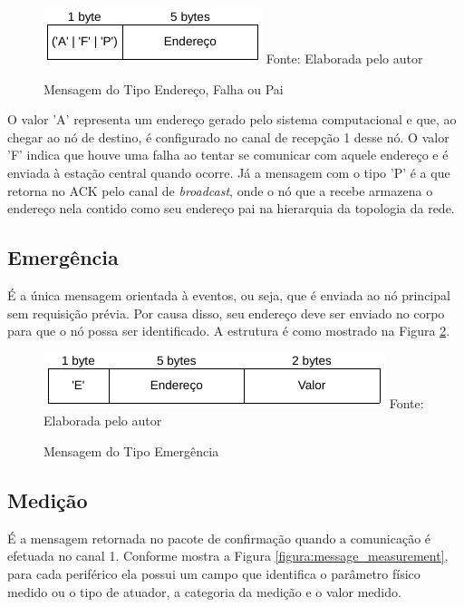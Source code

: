 {\begin{figure}[h!]
	\caption{Mensagem do Tipo Endereço, Falha ou Pai}
	\centering
	\includegraphics[scale=0.5]{../images/mensagem_end_falha_pai.png}
	\hspace{\linewidth}
	Fonte: Elaborada pelo autor
	\label{figura:message_addr_fail_parent}
\end{figure}

O valor 'A' representa um endereço gerado pelo sistema computacional e que, ao chegar ao nó de destino, é
configurado no canal de recepção 1 desse nó. O valor 'F' indica que houve uma falha ao tentar se comunicar com
aquele endereço e  é enviada à estação central quando ocorre. Já a mensagem com o tipo 'P' é a que retorna no
ACK pelo canal de \textit{broadcast}, onde o nó que a recebe armazena o endereço nela contido como seu
endereço pai na hierarquia da topologia da rede.

\subsection{Emergência}
É a única mensagem orientada à eventos, ou seja, que é enviada ao nó principal sem requisição prévia. Por
causa disso, seu endereço deve ser enviado no corpo para que o nó possa ser identificado. A estrutura é como
mostrado na Figura \ref{figura:message_emergency}.

\begin{figure}[h!]
	\caption{Mensagem do Tipo Emergência}
	\centering
	\includegraphics[scale=0.5]{../images/mensagem_emergencia.png}
	\hspace{\linewidth}
	Fonte: Elaborada pelo autor
	\label{figura:message_emergency}
\end{figure}

\subsection{Medição}
É a mensagem retornada no pacote de confirmação quando a comunicação é efetuada no canal 1. Conforme mostra
a Figura \ref{figura:message_measurement}, para cada periférico ela possui um campo que identifica o parâmetro
físico medido ou o tipo de atuador, a categoria da medição e o valor medido.

}
